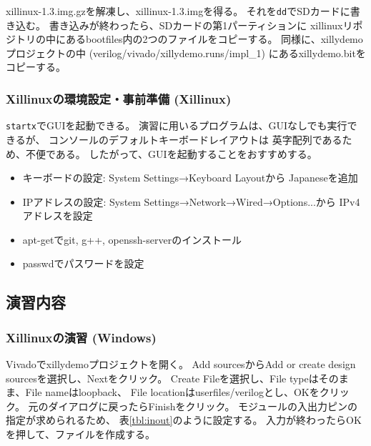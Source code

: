 \documentclass[11pt]{jsarticle}
\begin{document}
\vspace{-0.5cm}

xillinux-1.3.img.gzを解凍し、xillinux-1.3.imgを得る。
それを\verb|dd|でSDカードに書き込む。
書き込みが終わったら、SDカードの第1パーティションに
xillinuxリポジトリの中にあるbootfiles内の2つのファイルをコピーする。
同様に、xillydemoプロジェクトの中
(verilog/vivado/xillydemo.runs/impl\_1) にあるxillydemo.bitを
コピーする。

\subsubsection*{Xillinuxの環境設定・事前準備 (Xillinux)}
\verb|startx|でGUIを起動できる。
演習に用いるプログラムは、GUIなしでも実行できるが、
コンソールのデフォルトキーボードレイアウトは
英字配列であるため、不便である。
したがって、GUIを起動することをおすすめする。

\begin{itemize}
	\item
		キーボードの設定: System Settings→Keyboard Layoutから
		Japaneseを追加
	\item
		IPアドレスの設定: System Settings→Network→Wired→Options...から
		IPv4アドレスを設定
	\item
		apt-getでgit, g++, openssh-serverのインストール
	\item
		passwdでパスワードを設定
\end{itemize}

\subsection*{演習内容}
\subsubsection*{Xillinuxの演習 (Windows)}
Vivadoでxillydemoプロジェクトを開く。
Add sourcesからAdd or create design sourcesを選択し、Nextをクリック。
Create Fileを選択し、File typeはそのまま、File nameはloopback、
File locationはuserfiles/verilogとし、OKをクリック。
元のダイアログに戻ったらFinishをクリック。
モジュールの入出力ピンの指定が求められるため、
表\ref{tbl:inout}のように設定する。
入力が終わったらOKを押して、ファイルを作成する。
\end{document}
